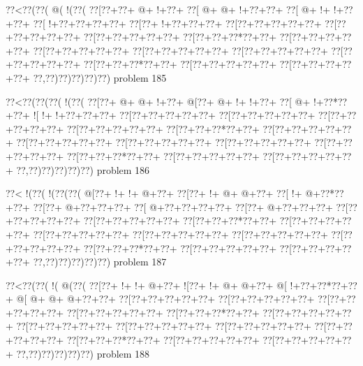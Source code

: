\vbox{\vbox{\goo
\0??<\0??(\0??(\- @(\- !(\0??(
\0??[\0??+\0??+\- @+\- !+\0??+
\0??[\- @+\- @+\- !+\0??+\0??+
\0??[\- @+\- !+\- !+\0??+\0??+
\0??[\- !+\0??+\0??+\0??+\0??+
\0??[\0??+\- !+\0??+\0??+\0??+
\0??[\0??+\0??+\0??+\0??+\0??+
\0??[\0??+\0??+\0??+\0??+\0??+
\0??[\0??+\0??+\0??+\0??+\0??+
\0??[\0??+\0??+\0??*\0??+\0??+
\0??[\0??+\0??+\0??+\0??+\0??+
\0??[\0??+\0??+\0??+\0??+\0??+
\0??[\0??+\0??+\0??+\0??+\0??+
\0??[\0??+\0??+\0??+\0??+\0??+
\0??[\0??+\0??+\0??+\0??+\0??+
\0??[\0??+\0??+\0??*\0??+\0??+
\0??[\0??+\0??+\0??+\0??+\0??+
\0??[\0??+\0??+\0??+\0??+\0??+
\0??,\0??)\0??)\0??)\0??)\0??)
}
\hfil problem 185\hfil\break
}

\vbox{\vbox{\goo
\0??<\0??(\0??(\0??(\- !(\0??(
\0??[\0??+\- @+\- @+\- !+\0??+
\- @[\0??+\- @+\- !+\- !+\0??+
\0??[\- @+\- !+\0??*\0??+\0??+
\- ![\- !+\- !+\0??+\0??+\0??+
\0??[\0??+\0??+\0??+\0??+\0??+
\0??[\0??+\0??+\0??+\0??+\0??+
\0??[\0??+\0??+\0??+\0??+\0??+
\0??[\0??+\0??+\0??+\0??+\0??+
\0??[\0??+\0??+\0??*\0??+\0??+
\0??[\0??+\0??+\0??+\0??+\0??+
\0??[\0??+\0??+\0??+\0??+\0??+
\0??[\0??+\0??+\0??+\0??+\0??+
\0??[\0??+\0??+\0??+\0??+\0??+
\0??[\0??+\0??+\0??+\0??+\0??+
\0??[\0??+\0??+\0??*\0??+\0??+
\0??[\0??+\0??+\0??+\0??+\0??+
\0??[\0??+\0??+\0??+\0??+\0??+
\0??,\0??)\0??)\0??)\0??)\0??)
}
\hfil problem 186\hfil\break
}

\vbox{\vbox{\goo
\0??<\- !(\0??(\- !(\0??(\0??(
\- @[\0??+\- !+\- !+\- @+\0??+
\0??[\0??+\- !+\- @+\- @+\0??+
\0??[\- !+\- @+\0??*\0??+\0??+
\0??[\0??+\- @+\0??+\0??+\0??+
\0??[\- @+\0??+\0??+\0??+\0??+
\0??[\0??+\- @+\0??+\0??+\0??+
\0??[\0??+\0??+\0??+\0??+\0??+
\0??[\0??+\0??+\0??+\0??+\0??+
\0??[\0??+\0??+\0??*\0??+\0??+
\0??[\0??+\0??+\0??+\0??+\0??+
\0??[\0??+\0??+\0??+\0??+\0??+
\0??[\0??+\0??+\0??+\0??+\0??+
\0??[\0??+\0??+\0??+\0??+\0??+
\0??[\0??+\0??+\0??+\0??+\0??+
\0??[\0??+\0??+\0??*\0??+\0??+
\0??[\0??+\0??+\0??+\0??+\0??+
\0??[\0??+\0??+\0??+\0??+\0??+
\0??,\0??)\0??)\0??)\0??)\0??)
}
\hfil problem 187\hfil\break
}

\vbox{\vbox{\goo
\0??<\0??(\0??(\- !(\- @(\0??(
\0??[\0??+\- !+\- !+\- @+\0??+
\- ![\0??+\- !+\- @+\- @+\0??+
\- @[\- !+\0??+\0??*\0??+\0??+
\- @[\- @+\- @+\- @+\0??+\0??+
\0??[\0??+\0??+\0??+\0??+\0??+
\0??[\0??+\0??+\0??+\0??+\0??+
\0??[\0??+\0??+\0??+\0??+\0??+
\0??[\0??+\0??+\0??+\0??+\0??+
\0??[\0??+\0??+\0??*\0??+\0??+
\0??[\0??+\0??+\0??+\0??+\0??+
\0??[\0??+\0??+\0??+\0??+\0??+
\0??[\0??+\0??+\0??+\0??+\0??+
\0??[\0??+\0??+\0??+\0??+\0??+
\0??[\0??+\0??+\0??+\0??+\0??+
\0??[\0??+\0??+\0??*\0??+\0??+
\0??[\0??+\0??+\0??+\0??+\0??+
\0??[\0??+\0??+\0??+\0??+\0??+
\0??,\0??)\0??)\0??)\0??)\0??)
}
\hfil problem 188\hfil\break
}

